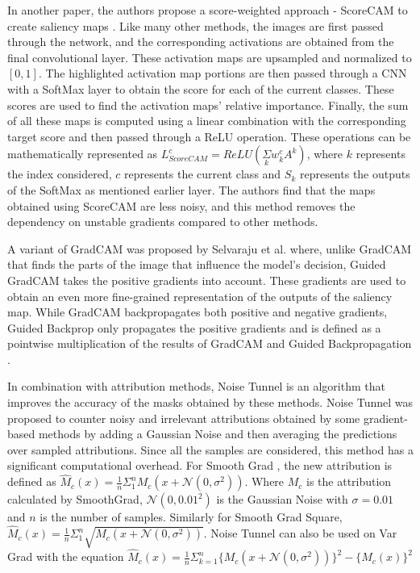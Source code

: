 In another paper, the authors propose a score-weighted approach - ScoreCAM to create saliency maps \cite{wangScoreCAMScoreWeightedVisual2020}. Like many other methods, the images are first passed through the network, and the corresponding activations are obtained from the final convolutional layer. These activation maps are upsampled and normalized to $[0,1]$. The highlighted activation map portions are then passed through a CNN with a SoftMax layer to obtain the score for each of the current classes. These scores are used to find the activation maps' relative importance. Finally, the sum of all these maps is computed using a linear combination with the corresponding target score and then passed through a ReLU operation. These operations can be mathematically represented as $L^{c}_{ScoreCAM} = ReLU(\underset{k}\Sigma w_{k}^{c}A^{k})$, where $k$ represents the index considered, $c$ represents the current class and $S_k$ represents the outputs of the SoftMax as mentioned earlier layer. The authors find that the maps obtained using ScoreCAM are less noisy, and this method removes the dependency on unstable gradients compared to other methods.

A variant of GradCAM \cite{selvarajuGradCAMVisualExplanations} was proposed by Selvaraju et al. \cite{selvarajuGradCAMWhyDid2017} where, unlike GradCAM that finds the parts of the image that influence the model's decision, Guided GradCAM takes the positive gradients into account. These gradients are used to obtain an even more fine-grained representation of the outputs of the saliency map. While GradCAM backpropagates both positive and negative gradients, Guided Backprop only propagates the positive gradients and is defined as a pointwise multiplication of the results of GradCAM and Guided Backpropagation \cite{springenbergStrivingSimplicityAll2015}.

In combination with attribution methods, Noise Tunnel \cite{kokhlikyanCaptumUnifiedGeneric2020} is an algorithm that improves the accuracy of the masks obtained by these methods. Noise Tunnel was proposed to counter noisy and irrelevant attributions obtained by some gradient-based methods by adding a Gaussian Noise and then averaging the predictions over sampled attributions. Since all the samples are considered, this method has a significant computational overhead. For Smooth Grad \cite{smilkovSmoothGradRemovingNoise2017}, the new attribution is defined as $\hat M_{c}(x) = \frac{1}{n}\Sigma_{1}^{n}M_{c}(x + \mathcal{N}(0, \sigma^{2}))$. Where $M_{c}$ is the attribution calculated by SmoothGrad, $\mathcal {N}(0, 0.01^2)$ is the Gaussian Noise with $\sigma = 0.01$ and $n$ is the number of samples. Similarly for Smooth Grad Square, $\hat M_{c}(x) = \frac{1}{n}\Sigma_{1}^{n}\sqrt{M_{c}(x + \mathcal{N}(0, \sigma^{2}))}$. Noise Tunnel can also be used on Var Grad \cite{richterVarGradLowVarianceGradient2020} with the equation $\hat M_{c}(x) = \frac{1}{n}\Sigma_{k=1}^{n}\{M_{c}(x + \mathcal{N}(0, \sigma^{2}))\}^{2}- \{\hat M_{c}(x)\}^{2}$

